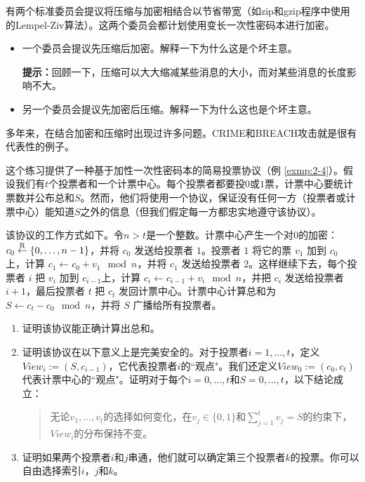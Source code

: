 \begin{exercise}[压缩并加密]
有两个标准委员会提议将压缩与加密相结合以节省带宽（如zip和gzip程序中使用的Lempel-Ziv算法）。这两个委员会都计划使用变长一次性密码本进行加密。
\begin{itemize}
	\item 一个委员会提议先压缩后加密。解释一下为什么这是个坏主意。

	\vspace{1pt}

	\textbf{提示：}回顾一下，压缩可以大大缩减某些消息的大小，而对某些消息的长度影响不大。
	\item 另一个委员会提议先加密后压缩。解释一下为什么这也是个坏主意。
\end{itemize}
多年来，在结合加密和压缩时出现过许多问题。CRIME和BREACH攻击就是很有代表性的例子。
\end{exercise}

\begin{exercise}[投票协议]
这个练习提供了一种基于加性一次性密码本的简易投票协议（例 \ref{exmp:2-4}）。假设我们有$t$个投票者和一个计票中心。每个投票者都要投$0$或$1$票，计票中心要统计票数并公布总和$S$。然而，他们将使用一个协议，保证没有任何一方（投票者或计票中心）能知道$S$之外的信息（但我们假定每一方都忠实地遵守该协议）。

该协议的工作方式如下。令$n>t$是一个整数。计票中心产生一个对$0$的加密：$c_0\overset{\rm R}\leftarrow\{0,\dots,n-1\}$，并将 $c_0$ 发送给投票者 $1$。投票者 $1$ 将它的票 $v_1$ 加到 $c_0$ 上，计算 $c_1\leftarrow c_0+v_1 \mod n$，并将 $c_1$ 发送给投票者 $2$。这样继续下去，每个投票者 $i$ 把 $v_i$ 加到 $c_{i-1} $上，计算 $c_i\leftarrow c_{i-1}+v_i \mod n$，并把 $c_i$ 发送给投票者 $i+1$，最后投票者 $t$ 把 $c_t$ 发回计票中心。计票中心计算总和为$S\leftarrow c_t-c_0 \mod n$，并将 $S$ 广播给所有投票者。
\begin{enumerate}[\indent(a)]
	\item 证明该协议能正确计算出总和。
	\item 证明该协议在以下意义上是完美安全的。对于投票者$i=1,\dots,t$，定义$View_i:=(S,c_{i-1})$，它代表投票者$i$的``观点"。我们还定义$View_0:=(c_0,c_t)$代表计票中心的``观点"。证明对于每个$i=0,\dots,t$和$S=0,\dots,t$，以下结论成立：
	\begin{quote}
		无论$v_1,\dots,v_t$的选择如何变化，在$v_j\in\{0,1\}$和$\sum^t_{j=1}v_j=S$的约束下，$View_i$的分布保持不变。
	\end{quote}
	\item 证明如果两个投票者$i$和$j$串通，他们就可以确定第三个投票者$k$的投票。你可以自由选择索引$i$，$j$和$k$。
\end{enumerate}
\end{exercise}


